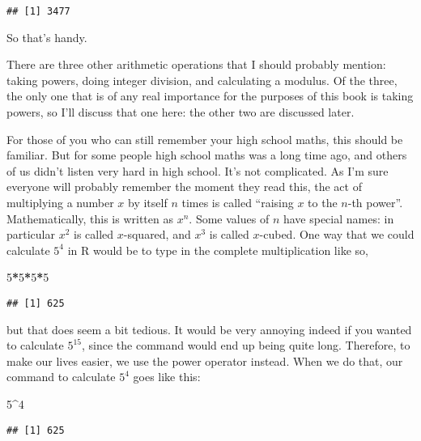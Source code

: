\documentclass[]{book}
\newenvironment{Shaded}{\begin{snugshade}}{\end{snugshade}}
\newcommand{\DecValTok}[1]{\textcolor[rgb]{0.00,0.00,0.81}{#1}}
\newcommand{\OperatorTok}[1]{\textcolor[rgb]{0.81,0.36,0.00}{\textbf{#1}}}
\begin{document}
\begin{verbatim}
## [1] 3477
\end{verbatim}

So that's handy.

There are three other arithmetic operations that I should probably mention: taking powers, doing integer division, and calculating a modulus. Of the three, the only one that is of any real importance for the purposes of this book is taking powers, so I'll discuss that one here: the other two are discussed later.

For those of you who can still remember your high school maths, this should be familiar. But for some people high school maths was a long time ago, and others of us didn't listen very hard in high school. It's not complicated. As I'm sure everyone will probably remember the moment they read this, the act of multiplying a number \(x\) by itself \(n\) times is called ``raising \(x\) to the \(n\)-th power''. Mathematically, this is written as \(x^n\). Some values of \(n\) have special names: in particular \(x^2\) is called \(x\)-squared, and \(x^3\) is called \(x\)-cubed. One way that we could calculate \(5^4\) in R would be to type in the complete multiplication like so,

\begin{Shaded}
\begin{Highlighting}[]
\DecValTok{5}\OperatorTok{*}\DecValTok{5}\OperatorTok{*}\DecValTok{5}\OperatorTok{*}\DecValTok{5}
\end{Highlighting}
\end{Shaded}

\begin{verbatim}
## [1] 625
\end{verbatim}

but that does seem a bit tedious. It would be very annoying indeed if you wanted to calculate \(5^{15}\), since the command would end up being quite long. Therefore, to make our lives easier, we use the power operator instead. When we do that, our command to calculate \(5^4\) goes like this:

\begin{Shaded}
\begin{Highlighting}[]
\DecValTok{5}\OperatorTok{^}\DecValTok{4}
\end{Highlighting}
\end{Shaded}

\begin{verbatim}
## [1] 625
\end{verbatim}
\end{document}
